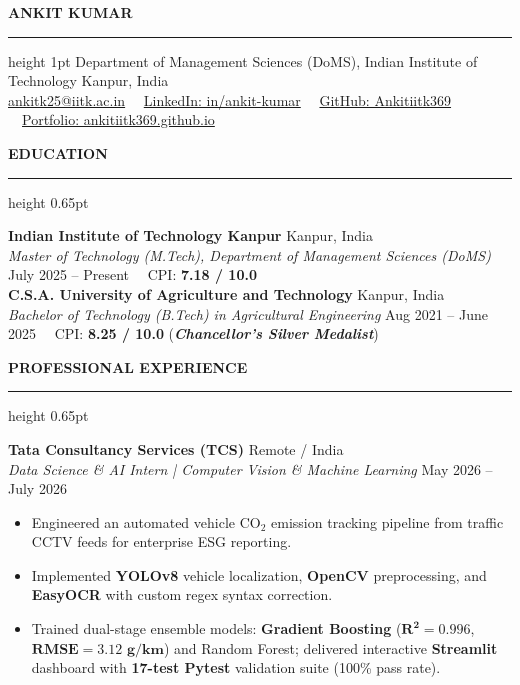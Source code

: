 \documentclass[10pt]{article}
\newcommand{\resumesection}[1]{%
  \vspace{4.5pt}%
  {\large \textbf{\uppercase{#1}}}%
  \vspace{1.5pt}%
  \hrule height 0.65pt%
  \vspace{3pt}%
}
\begin{document}
\begin{center}
    {\Huge \textbf{ANKIT KUMAR}}\\ 
    \vspace{2pt}
    \hrule height 1pt
    \vspace{3pt}
    Department of Management Sciences (DoMS), Indian Institute of Technology Kanpur, India\\
    \href{mailto:ankitk25@iitk.ac.in}{ankitk25@iitk.ac.in} \ \textbullet \ 
    \href{https://linkedin.com/in/ankit-kumar}{LinkedIn: in/ankit-kumar} \ \textbullet \ 
    \href{https://github.com/Ankitiitk369}{GitHub: Ankitiitk369} \ \textbullet \ 
    \href{https://ankitiitk369.github.io}{Portfolio: ankitiitk369.github.io}
\end{center}

\vspace{-3pt}

\resumesection{Education}

\textbf{Indian Institute of Technology Kanpur} \hfill Kanpur, India\\
\textit{Master of Technology (M.Tech), Department of Management Sciences (DoMS)} \hfill July 2025 -- Present \ \textbullet \ CPI: \textbf{7.18 / 10.0}\\
\textbf{C.S.A. University of Agriculture and Technology} \hfill Kanpur, India\\
\textit{Bachelor of Technology (B.Tech) in Agricultural Engineering} \hfill Aug 2021 -- June 2025 \ \textbullet \ CPI: \textbf{8.25 / 10.0} (\textit{\textbf{Chancellor's Silver Medalist}})

\resumesection{Professional Experience}

\textbf{Tata Consultancy Services (TCS)} \hfill Remote / India\\
\textit{Data Science \& AI Intern | Computer Vision \& Machine Learning} \hfill May 2026 -- July 2026
\begin{itemize}[noitemsep, topsep=1pt, partopsep=0pt, parsep=0.5pt]
    \item Engineered an automated vehicle $\text{CO}_2$ emission tracking pipeline from traffic CCTV feeds for enterprise ESG reporting.
    \item Implemented \textbf{YOLOv8} vehicle localization, \textbf{OpenCV} preprocessing, and \textbf{EasyOCR} with custom regex syntax correction.
    \item Trained dual-stage ensemble models: \textbf{Gradient Boosting} ($\mathbf{R^2 = 0.996}$, $\mathbf{\text{RMSE} = 3.12\text{ g/km}}$) and Random Forest; delivered interactive \textbf{Streamlit} dashboard with \textbf{17-test Pytest} validation suite (100\% pass rate).
\end{itemize}
\end{document}
